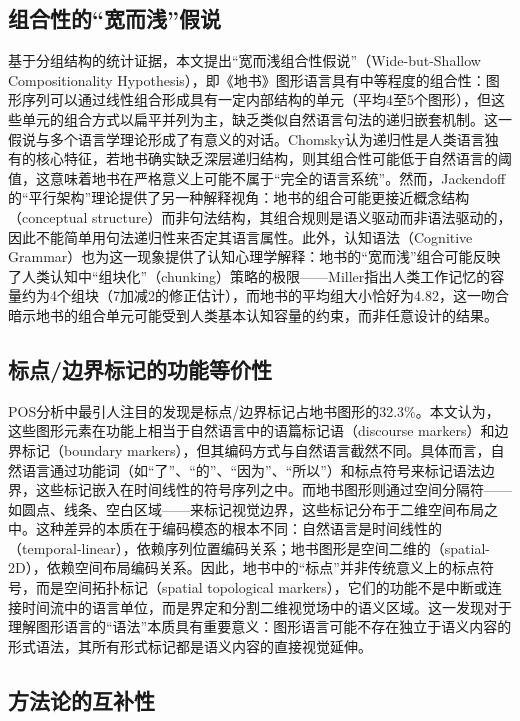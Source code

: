 \documentclass[a4paper,12pt]{article}
\begin{document}
\subsection{组合性的``宽而浅''假说}

基于分组结构的统计证据，本文提出``宽而浅组合性假说''（Wide-but-Shallow Compositionality Hypothesis），即《地书》图形语言具有中等程度的组合性：图形序列可以通过线性组合形成具有一定内部结构的单元（平均4至5个图形），但这些单元的组合方式以扁平并列为主，缺乏类似自然语言句法的递归嵌套机制。这一假说与多个语言学理论形成了有意义的对话。Chomsky\cite{chomsky1957}认为递归性是人类语言独有的核心特征，若地书确实缺乏深层递归结构，则其组合性可能低于自然语言的阈值，这意味着地书在严格意义上可能不属于``完全的语言系统''。然而，Jackendoff\cite{jackendoff2002}的``平行架构''理论提供了另一种解释视角：地书的组合可能更接近概念结构（conceptual structure）而非句法结构，其组合规则是语义驱动而非语法驱动的，因此不能简单用句法递归性来否定其语言属性。此外，认知语法（Cognitive Grammar）\cite{langacker1987}也为这一现象提供了认知心理学解释：地书的``宽而浅''组合可能反映了人类认知中``组块化''（chunking）策略的极限——Miller\cite{miller1956}指出人类工作记忆的容量约为4个组块（7加减2的修正估计），而地书的平均组大小恰好为4.82，这一吻合暗示地书的组合单元可能受到人类基本认知容量的约束，而非任意设计的结果。

\subsection{标点/边界标记的功能等价性}

POS分析中最引人注目的发现是标点/边界标记占地书图形的32.3\%。本文认为，这些图形元素在功能上相当于自然语言中的语篇标记语（discourse markers）和边界标记（boundary markers），但其编码方式与自然语言截然不同。具体而言，自然语言通过功能词（如``了''、``的''、``因为''、``所以''）和标点符号来标记语法边界，这些标记嵌入在时间线性的符号序列之中。而地书图形则通过空间分隔符——如圆点、线条、空白区域——来标记视觉边界，这些标记分布于二维空间布局之中。这种差异的本质在于编码模态的根本不同：自然语言是时间线性的（temporal-linear），依赖序列位置编码关系；地书图形是空间二维的（spatial-2D），依赖空间布局编码关系。因此，地书中的``标点''并非传统意义上的标点符号，而是空间拓扑标记（spatial topological markers），它们的功能不是中断或连接时间流中的语言单位，而是界定和分割二维视觉场中的语义区域。这一发现对于理解图形语言的``语法''本质具有重要意义：图形语言可能不存在独立于语义内容的形式语法，其所有形式标记都是语义内容的直接视觉延伸。

\subsection{方法论的互补性}
\end{document}

